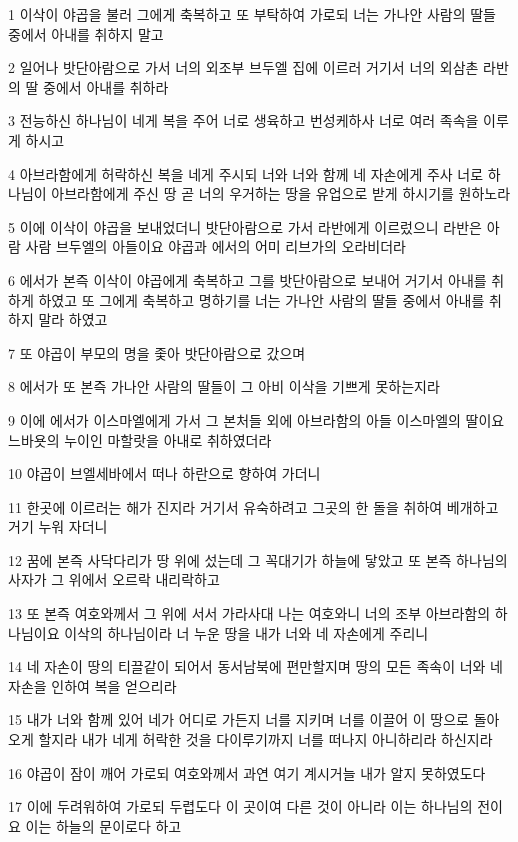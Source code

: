 \par 1 이삭이 야곱을 불러 그에게 축복하고 또 부탁하여 가로되 너는 가나안 사람의 딸들 중에서 아내를 취하지 말고
\par 2 일어나 밧단아람으로 가서 너의 외조부 브두엘 집에 이르러 거기서 너의 외삼촌 라반의 딸 중에서 아내를 취하라
\par 3 전능하신 하나님이 네게 복을 주어 너로 생육하고 번성케하사 너로 여러 족속을 이루게 하시고
\par 4 아브라함에게 허락하신 복을 네게 주시되 너와 너와 함께 네 자손에게 주사 너로 하나님이 아브라함에게 주신 땅 곧 너의 우거하는 땅을 유업으로 받게 하시기를 원하노라
\par 5 이에 이삭이 야곱을 보내었더니 밧단아람으로 가서 라반에게 이르렀으니 라반은 아람 사람 브두엘의 아들이요 야곱과 에서의 어미 리브가의 오라비더라
\par 6 에서가 본즉 이삭이 야곱에게 축복하고 그를 밧단아람으로 보내어 거기서 아내를 취하게 하였고 또 그에게 축복하고 명하기를 너는 가나안 사람의 딸들 중에서 아내를 취하지 말라 하였고
\par 7 또 야곱이 부모의 명을 좇아 밧단아람으로 갔으며
\par 8 에서가 또 본즉 가나안 사람의 딸들이 그 아비 이삭을 기쁘게 못하는지라
\par 9 이에 에서가 이스마엘에게 가서 그 본처들 외에 아브라함의 아들 이스마엘의 딸이요 느바욧의 누이인 마할랏을 아내로 취하였더라
\par 10 야곱이 브엘세바에서 떠나 하란으로 향하여 가더니
\par 11 한곳에 이르러는 해가 진지라 거기서 유숙하려고 그곳의 한 돌을 취하여 베개하고 거기 누워 자더니
\par 12 꿈에 본즉 사닥다리가 땅 위에 섰는데 그 꼭대기가 하늘에 닿았고 또 본즉 하나님의 사자가 그 위에서 오르락 내리락하고
\par 13 또 본즉 여호와께서 그 위에 서서 가라사대 나는 여호와니 너의 조부 아브라함의 하나님이요 이삭의 하나님이라 너 누운 땅을 내가 너와 네 자손에게 주리니
\par 14 네 자손이 땅의 티끌같이 되어서 동서남북에 편만할지며 땅의 모든 족속이 너와 네 자손을 인하여 복을 얻으리라
\par 15 내가 너와 함께 있어 네가 어디로 가든지 너를 지키며 너를 이끌어 이 땅으로 돌아오게 할지라 내가 네게 허락한 것을 다이루기까지 너를 떠나지 아니하리라 하신지라
\par 16 야곱이 잠이 깨어 가로되 여호와께서 과연 여기 계시거늘 내가 알지 못하였도다
\par 17 이에 두려워하여 가로되 두렵도다 이 곳이여 다른 것이 아니라 이는 하나님의 전이요 이는 하늘의 문이로다 하고
